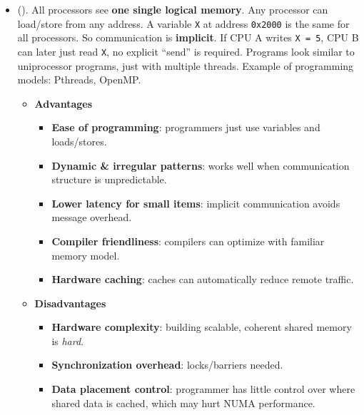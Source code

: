 \begin{itemize}
    \item {} (). All processors see \textbf{one single logical memory}. Any processor can load/store from any address. A variable \texttt{X} at address \texttt{0x2000} is the same for all processors. So communication is \textbf{implicit}. If CPU A writes \texttt{X = 5}, CPU B can later just read \texttt{X}, no explicit ``send'' is required. Programs look similar to uniprocessor programs, just with multiple threads. Example of programming models: Pthreads, OpenMP.

    \begin{itemize}
        \item[\textcolor{Green3}{\faIcon{check-circle}}] \textcolor{Green3}{\textbf{Advantages}}
        \begin{itemize}
            \item[\textcolor{Green3}{\faIcon{check}}] \textcolor{Green3}{\textbf{Ease of programming}}: programmers just use variables and loads/stores.
            \item[\textcolor{Green3}{\faIcon{check}}] \textcolor{Green3}{\textbf{Dynamic \& irregular patterns}}: works well when communication structure is unpredictable.
            \item[\textcolor{Green3}{\faIcon{check}}] \textcolor{Green3}{\textbf{Lower latency for small items}}: implicit communication avoids message overhead.
            \item[\textcolor{Green3}{\faIcon{check}}] \textcolor{Green3}{\textbf{Compiler friendliness}}: compilers can optimize with familiar memory model.
            \item[\textcolor{Green3}{\faIcon{check}}] \textcolor{Green3}{\textbf{Hardware caching}}: caches can automatically reduce remote traffic.
        \end{itemize}
        \item[\textcolor{Red2}{\faIcon{times-circle}}] \textcolor{Red2}{\textbf{Disadvantages}}
        \begin{itemize}
            \item[\textcolor{Red2}{\faIcon{times}}] \textcolor{Red2}{\textbf{Hardware complexity}}: building scalable, coherent shared memory is \emph{hard}.
            \item[\textcolor{Red2}{\faIcon{times}}] \textcolor{Red2}{\textbf{Synchronization overhead}}: locks/barriers needed.
            \item[\textcolor{Red2}{\faIcon{times}}] \textcolor{Red2}{\textbf{Data placement control}}: programmer has little control over where shared data is cached, which may hurt NUMA performance.
        \end{itemize}
    \end{itemize}



\end{itemize}
